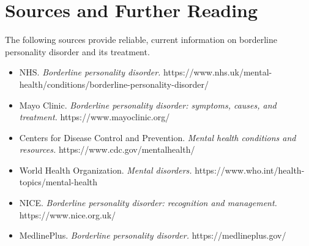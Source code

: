 \section*{Sources and Further Reading}
The following sources provide reliable, current information on borderline personality disorder and its treatment.
\begin{itemize}
    \item NHS. \textit{Borderline personality disorder.} https://www.nhs.uk/mental-health/conditions/borderline-personality-disorder/
    \item Mayo Clinic. \textit{Borderline personality disorder: symptoms, causes, and treatment.} https://www.mayoclinic.org/
    \item Centers for Disease Control and Prevention. \textit{Mental health conditions and resources.} https://www.cdc.gov/mentalhealth/
    \item World Health Organization. \textit{Mental disorders.} https://www.who.int/health-topics/mental-health
    \item NICE. \textit{Borderline personality disorder: recognition and management.} https://www.nice.org.uk/
    \item MedlinePlus. \textit{Borderline personality disorder.} https://medlineplus.gov/
\end{itemize}
